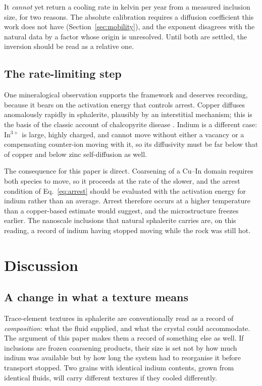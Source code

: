 \documentclass[11pt,a4paper]{article}
\begin{document}
It \emph{cannot} yet return a cooling rate in kelvin per year from a measured
inclusion size, for two reasons. The absolute calibration requires a diffusion
coefficient this work does not have (Section~\ref{sec:mobility}), and the
exponent disagrees with the natural data by a factor whose origin is unresolved.
Until both are settled, the inversion should be read as a relative one.

\subsection{The rate-limiting step}

One mineralogical observation supports the framework and deserves recording,
because it bears on the activation energy that controls arrest. Copper diffuses
anomalously rapidly in sphalerite, plausibly by an interstitial mechanism; this
is the basis of the classic account of chalcopyrite disease
\citep{barton1987}. Indium is a different case: In$^{3+}$ is large, highly
charged, and cannot move without either a vacancy or a compensating counter-ion
moving with it, so its diffusivity must be far below that of copper and below
zinc self-diffusion as well.

The consequence for this paper is direct. Coarsening of a Cu--In domain requires
both species to move, so it proceeds at the rate of the slower, and the arrest
condition of Eq.~\eqref{eq:arrest} should be evaluated with the activation
energy for indium rather than an average. Arrest therefore occurs at a higher
temperature than a copper-based estimate would suggest, and the microstructure
freezes earlier. The nanoscale inclusions that natural sphalerite carries are,
on this reading, a record of indium having stopped moving while the rock was
still hot.

\section{Discussion}
\label{sec:discussion}

\subsection{A change in what a texture means}

Trace-element textures in sphalerite are conventionally read as a record of
\emph{composition}: what the fluid supplied, and what the crystal could
accommodate. The argument of this paper makes them a record of something else
as well. If inclusions are frozen coarsening products, their size is set not by
how much indium was available but by how long the system had to reorganise it
before transport stopped. Two grains with identical indium contents, grown from
identical fluids, will carry different textures if they cooled differently.
\end{document}
